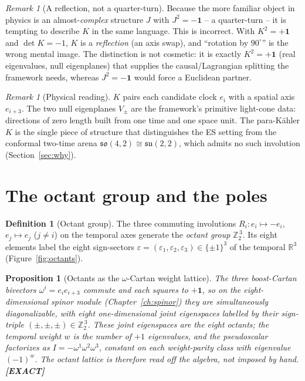 \documentclass[11pt,oneside]{book}
\newcommand{\Zt}{\mathbb{Z}_2}
\newcommand{\RR}{\mathbb{R}}
\newcommand{\su}{\mathfrak{su}}
\newcommand{\so}{\mathfrak{so}}
\newcommand{\status}[1]{{\sffamily\bfseries\color{statuscol}[#1]}}
\theoremstyle{plain}
\newtheorem{proposition}[theorem]{Proposition}
\theoremstyle{definition}
\newtheorem{definition}[theorem]{Definition}
\theoremstyle{remark}
\newtheorem{remark}[theorem]{Remark}
\begin{document}
\begin{remark}[A reflection, not a quarter-turn]
\label{rem:K-misconception}
Because the more familiar object in physics is an almost-\emph{complex} structure
$J$ with $J^2=-\mathbf 1$ -- a quarter-turn -- it is tempting to describe $K$ in
the same language. This is incorrect. With $K^2=+\mathbf 1$ and $\det K=-1$, $K$ is
a \emph{reflection} (an axis swap), and ``rotation by $90^\circ$'' is the wrong
mental image. The distinction is not cosmetic: it is exactly $K^2=+\mathbf 1$ (real
eigenvalues, null eigenplanes) that supplies the causal/Lagrangian splitting the
framework needs, whereas $J^2=-\mathbf 1$ would force a Euclidean partner.
\end{remark}

\begin{remark}[Physical reading]
$K$ pairs each candidate clock $e_i$ with a spatial axis $e_{i+3}$. The two null
eigenplanes $V_\pm$ are the framework's primitive light-cone data: directions of
zero length built from one time and one space unit. The para-K\"ahler $K$ is the
single piece of structure that distinguishes the ES setting from the conformal
two-time arena $\so(4,2)\cong\su(2,2)$, which admits no such involution
(Section~\ref{sec:why}).
\end{remark}

\section{The octant group and the poles}
\label{sec:octants}

\begin{definition}[Octant group]
\label{def:octants}
The three commuting involutions $R_i:e_i\mapsto-e_i$, $e_{j}\mapsto e_j$
($j\neq i$) on the temporal axes generate the \emph{octant group}
$\Zt^{\,3}$. Its eight elements label the eight sign-sectors
$\varepsilon=(\varepsilon_1,\varepsilon_2,\varepsilon_3)\in\{\pm1\}^3$ of the
temporal $\RR^3$ (Figure~\ref{fig:octants}).
\end{definition}

\begin{proposition}[Octants as the $\omega$-Cartan weight lattice]
\label{prop:omega-cartan}
The three boost-Cartan bivectors $\omega^i=e_ie_{i+3}$ commute and each squares to
$+\mathbf 1$, so on the eight-dimensional spinor module
(Chapter~\ref{ch:spinor}) they are simultaneously diagonalizable, with eight
one-dimensional joint eigenspaces labelled by their sign-triple
$(\pm,\pm,\pm)\in\Zt^{\,3}$. These joint eigenspaces \emph{are} the eight octants;
the temporal weight $w$ is the number of $+1$ eigenvalues, and the pseudoscalar
factorizes as $I=-\omega^1\omega^2\omega^3$, constant on each weight-parity class
with eigenvalue $(-1)^w$. The octant lattice is therefore read off the algebra, not
imposed by hand. \status{EXACT}
\end{proposition}
\end{document}

